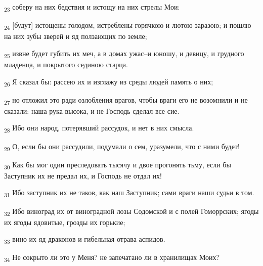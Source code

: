 \begin{tcolorbox}
\textsubscript{23} соберу на них бедствия и истощу на них стрелы Мои:
\end{tcolorbox}
\begin{tcolorbox}
\textsubscript{24} [будут] истощены голодом, истреблены горячкою и лютою заразою; и пошлю на них зубы зверей и яд ползающих по земле;
\end{tcolorbox}
\begin{tcolorbox}
\textsubscript{25} извне будет губить их меч, а в домах ужас--и юношу, и девицу, и грудного младенца, и покрытого сединою старца.
\end{tcolorbox}
\begin{tcolorbox}
\textsubscript{26} Я сказал бы: рассею их и изглажу из среды людей память о них;
\end{tcolorbox}
\begin{tcolorbox}
\textsubscript{27} но отложил это ради озлобления врагов, чтобы враги его не возомнили и не сказали: наша рука высока, и не Господь сделал все сие.
\end{tcolorbox}
\begin{tcolorbox}
\textsubscript{28} Ибо они народ, потерявший рассудок, и нет в них смысла.
\end{tcolorbox}
\begin{tcolorbox}
\textsubscript{29} О, если бы они рассудили, подумали о сем, уразумели, что с ними будет!
\end{tcolorbox}
\begin{tcolorbox}
\textsubscript{30} Как бы мог один преследовать тысячу и двое прогонять тьму, если бы Заступник их не предал их, и Господь не отдал их!
\end{tcolorbox}
\begin{tcolorbox}
\textsubscript{31} Ибо заступник их не таков, как наш Заступник; сами враги наши судьи в том.
\end{tcolorbox}
\begin{tcolorbox}
\textsubscript{32} Ибо виноград их от виноградной лозы Содомской и с полей Гоморрских; ягоды их ягоды ядовитые, грозды их горькие;
\end{tcolorbox}
\begin{tcolorbox}
\textsubscript{33} вино их яд драконов и гибельная отрава аспидов.
\end{tcolorbox}
\begin{tcolorbox}
\textsubscript{34} Не сокрыто ли это у Меня? не запечатано ли в хранилищах Моих?
\end{tcolorbox}
